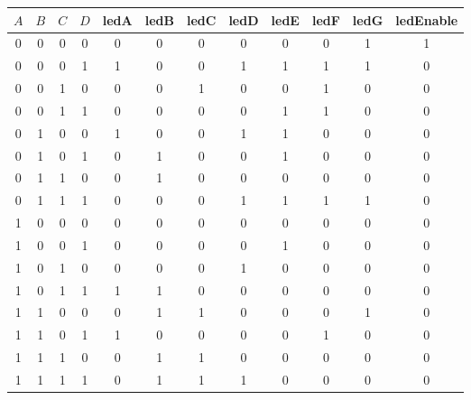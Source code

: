 \documentclass[9pt]{article}
\begin{document}
\begin{enumerate}
   \begin{center}
    \begin{tabular}{@{}|c|c|c|c|c|c|c|c|c|c|c|c|@{}}
   \hline
         $A$ & $B$ & $C$ & $D$ & ledA & ledB & ledC & ledD & ledE & ledF & ledG
             & ledEnable \\ \hline
         0 & 0 & 0 & 0 & 0 & 0 & 0 & 0 & 0 & 0 & 1 & 1 \\ \hline
         0 & 0 & 0 & 1 & 1 & 0 & 0 & 1 & 1 & 1 & 1 & 0 \\ \hline
         0 & 0 & 1 & 0 & 0 & 0 & 1 & 0 & 0 & 1 & 0 & 0 \\ \hline
         0 & 0 & 1 & 1 & 0 & 0 & 0 & 0 & 1 & 1 & 0 & 0 \\ \hline
         0 & 1 & 0 & 0 & 1 & 0 & 0 & 1 & 1 & 0 & 0 & 0 \\ \hline
         0 & 1 & 0 & 1 & 0 & 1 & 0 & 0 & 1 & 0 & 0 & 0 \\ \hline
         0 & 1 & 1 & 0 & 0 & 1 & 0 & 0 & 0 & 0 & 0 & 0 \\ \hline
         0 & 1 & 1 & 1 & 0 & 0 & 0 & 1 & 1 & 1 & 1 & 0 \\ \hline
         1 & 0 & 0 & 0 & 0 & 0 & 0 & 0 & 0 & 0 & 0 & 0 \\ \hline
         1 & 0 & 0 & 1 & 0 & 0 & 0 & 0 & 1 & 0 & 0 & 0 \\ \hline
         1 & 0 & 1 & 0 & 0 & 0 & 0 & 1 & 0 & 0 & 0 & 0 \\ \hline
         1 & 0 & 1 & 1 & 1 & 1 & 0 & 0 & 0 & 0 & 0 & 0 \\ \hline
         1 & 1 & 0 & 0 & 0 & 1 & 1 & 0 & 0 & 0 & 1 & 0 \\ \hline
         1 & 1 & 0 & 1 & 1 & 0 & 0 & 0 & 0 & 1 & 0 & 0 \\ \hline
         1 & 1 & 1 & 0 & 0 & 1 & 1 & 0 & 0 & 0 & 0 & 0 \\ \hline
         1 & 1 & 1 & 1 & 0 & 1 & 1 & 1 & 0 & 0 & 0 & 0 \\ \hline
\end{tabular}
   \end{center}
\end{enumerate}
\end{document}
